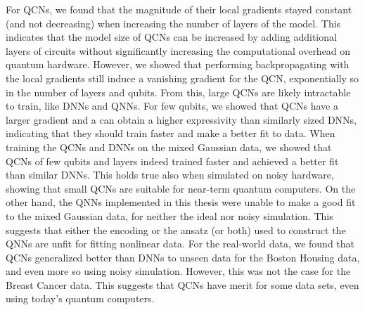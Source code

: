 For QCNs, we found that the magnitude of their local gradients stayed constant (and not decreasing) when increasing the number of layers of the model. This indicates that the model size of QCNs can be increased by adding additional layers of circuits without significantly increasing the computational overhead on quantum hardware. However, we showed that performing backpropagating with the local gradients still induce a vanishing gradient for the QCN, exponentially so in the number of layers and qubits. From this, large QCNs are likely intractable to train, like DNNs and QNNs. For few qubits, we showed that QCNs have a larger gradient and a can obtain a higher expressivity than similarly sized DNNs, indicating that they should train faster and make a better fit to data. When training the QCNs and DNNs on the mixed Gaussian data, we showed that QCNs of few qubits and layers indeed trained faster and achieved a better fit than similar DNNs. This holds true also when simulated on noisy hardware, showing that small QCNs are suitable for near-term quantum computers. On the other hand, the QNNs implemented in this thesis were unable to make a good fit to the mixed Gaussian data, for neither the ideal nor noisy simulation. This suggests that either the encoding or the ansatz (or both) used to construct the QNNs are unfit for fitting nonlinear data. For the real-world data, we found that QCNs generalized better than DNNs to unseen data for the Boston Housing data, and even more so using noisy simulation. However, this was not the case for the Breast Cancer data. This suggests that QCNs have merit for some data sets, even using today's quantum computers.